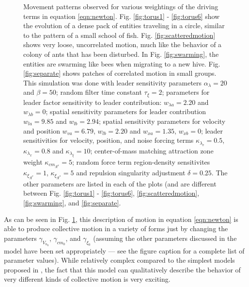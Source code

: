 \documentclass[conference]{IEEEtran}
\begin{document}
\begin{figure}[htbp]
{        \label{fig:separate}
    }
    \caption{
        Movement patterns observed for various weightings of the driving terms in equation \ref{eqn:newton}.
        Fig. \ref{fig:torus1} - \ref{fig:torus6} show the evolution of a dense pack of entities traveling in a circle, similar to the pattern of a small school of fish.
        Fig. \ref{fig:scatteredmotion} shows very loose, uncorrelated motion, much like the behavior of a colony of ants that has been disturbed.
        In Fig. \ref{fig:swarming}, the entities are swarming like bees when migrating to a new hive.
        Fig. \ref{fig:separate} shows patches of correlated motion in small groups.
        This simulation was done with leader sensitivity parameters $\alpha_\lambda = 20$ and $\beta = 50$;
        random filter time constant $\tau_\xi = 2$;
        parameters for leader factor sensitivity to leader contribution: $w_{\lambda a} = 2.20$ and $w_{\lambda b} = 0$;
        spatial sensitivity parameters for leader contribution $w_{la} = 9.85$ and $w_{lb} = 2.94$;
        spatial sensitivity parameters for velocity and position $w_{va} = 6.79$, $w_{lb} = 2.20$ and $w_{xa} = 1.35$, $w_{xb} = 0$;
        leader sensitivities for velocity, position, and noise forcing terms $\kappa_{\lambda_v} = 0.5$, $\kappa_{\lambda_x} = 0.8$ and $\kappa_{\lambda_{\xi}} = 10$;
        center-of-mass matching attraction zone weight $\kappa_{cm_{\mathcal{R}^a}} = 5$;
        random force term region-density sensitivites $\kappa_{\xi_{\mathcal{R}^o}} = 1$, $\kappa_{\xi_{\mathcal{R}^a}} = 5$
        and repulsion singularity adjustment $\delta = 0.25$.
        The other parameters are listed in each of the plots (and are different between Fig. \ref{fig:torus1} - \ref{fig:torus6}, \ref{fig:scatteredmotion}, \ref{fig:swarming}, and \ref{fig:separate}.
    }
    \label{fig:movement}
\end{figure}

As can be seen in Fig. \ref{fig:movement}, this description of motion in equation \ref{eqn:newton} is able to produce collective motion in a variety of forms just by changing the parameters $\gamma_{V_{n_0}}$, $\gamma_{cm_0}$, and $\gamma_{\xi_0}$ (assuming the other parameters discussed in the model have been set appropriately --- see the figure caption for a complete list of parameter values).
While relatively complex compared to the simplest models proposed in \cite{Vicsek}, the fact that this model can qualitatively describe the behavior of very different kinds of collective motion is very exciting.
\end{document}

